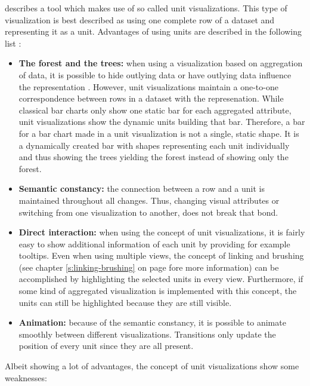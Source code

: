 \citeauthor{Drucker2015} describes a tool which makes use of so called unit visualizations. This type of visualization is best described as using one complete row of a dataset and representing it as a unit. Advantages of using units are described in the following list :
\begin{itemize}
\item \textbf{The forest and the trees:} when using a visualization based on aggregation of data, it is possible to hide outlying data or have outlying data influence the representation . However, unit visualizations maintain a one-to-one correspondence between rows in a dataset with the represenation. While classical bar charts only show one static bar for each aggregated attribute, unit visualizations show the dynamic units building that bar. Therefore, a bar for a bar chart made in a unit visualization is not a single, static shape. It is a dynamically created bar with shapes representing each unit individually and thus showing the trees yielding the forest instead of showing only the forest.

\item \textbf{Semantic constancy:} the connection between a row and a unit is maintained throughout all changes. Thus, changing visual attributes or switching from one visualization to another, does not break that bond.

\item \textbf{Direct interaction:} when using the concept of unit visualizations, it is fairly easy to show additional information of each unit by providing for example tooltips. Even when using multiple views, the concept of linking and brushing (see chapter \ref{s:linking-brushing} on page \pageref{s:linking-brushing} fore more information) can be accomplished by highlighting the selected units in every view. Furthermore, if some kind of aggregated visualization is implemented with this concept, the units can still be highlighted because they are still visible.

\item \textbf{Animation:} because of the semantic constancy, it is possible to animate smoothly between different visualizations. Transitions only update the position of every unit since they are all present.

\end{itemize}

Albeit showing a lot of advantages, the concept of unit visualizations show some weaknesses:

